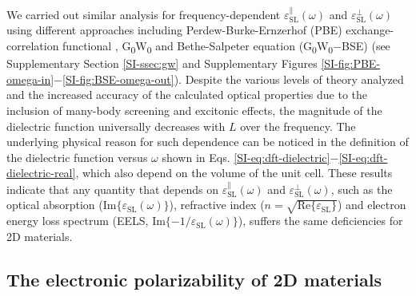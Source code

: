 \documentclass[journal=ancac3,manuscript=article,email=true,hyperref=true,keywords=false]{achemso}
\begin{document}
We carried out similar analysis for
frequency-dependent $\varepsilon^{\parallel}_{\mathrm{SL}}(\omega)$
and $\varepsilon^{\perp}_{\mathrm{SL}}(\omega)$ using different 
approaches including Perdew-Burke-Ernzerhof (PBE)
exchange-correlation functional
\cite{Perdew_1996,Ernzerhof99,Paier_2005_PBE}, 
G\textsubscript{0}W\textsubscript{0}\cite{Hedin_1965} and
Bethe-Salpeter equation (G\textsubscript{0}W\textsubscript{0}$-$BSE)\cite{Onida_2002} (see Supplementary Section \ref{SI-ssec:gw} and 
Supplementary Figures \ref{SI-fig:PBE-omega-in}$-$\ref{SI-fig:BSE-omega-out}). 
%
%
Despite the various levels of theory analyzed and the increased 
accuracy of the calculated optical properties due to the inclusion of 
many-body screening and excitonic effects, 
the magnitude of the dielectric function universally decreases
with $L$ over the frequency. The underlying physical reason for such 
dependence can be noticed in the definition of the dielectric 
function versus $\omega$ shown in Eqs. \ref{SI-eq:dft-dielectric}$-$\ref{SI-eq:dft-dielectric-real}, which also depend on the volume of the unit cell. 
%
These results indicate that any 
quantity that depends on
$\varepsilon^{\parallel}_{\mathrm{SL}}(\omega)$ and
$\varepsilon^{\perp}_{\mathrm{SL}}(\omega)$, such as the optical
absorption ($\mathrm{Im}\{\varepsilon_{\mathrm{SL}}(\omega)\}$), refractive index ($n=\sqrt{\mathrm{Re}\{\varepsilon_{\mathrm{SL}}\}}$) and electron energy loss spectrum (EELS, $\mathrm{Im}\{-1/\varepsilon_{\mathrm{SL}}(\omega)\}$), suffers the same deficiencies for 2D materials. 



\subsection{The electronic polarizability of 2D materials}
\label{sec:electr-polar-2d}
\end{document}
